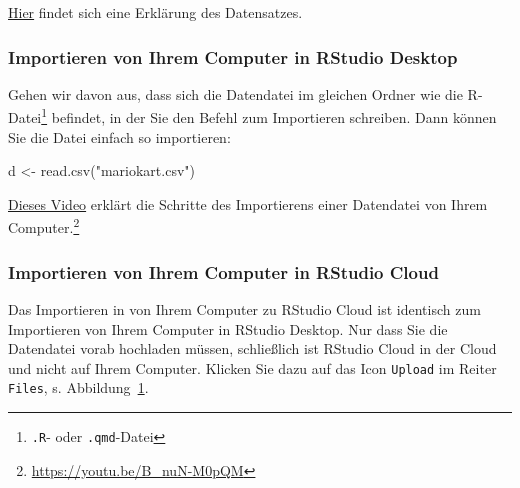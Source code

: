 \documentclass[
  a4paper,
  DIV=11]{scrreprt}
\newenvironment{Shaded}{\begin{snugshade}}{\end{snugshade}}
\newcommand{\FunctionTok}[1]{\textcolor[rgb]{0.28,0.35,0.67}{#1}}
\newcommand{\NormalTok}[1]{\textcolor[rgb]{0.00,0.23,0.31}{#1}}
\newcommand{\OtherTok}[1]{\textcolor[rgb]{0.00,0.23,0.31}{#1}}
\newcommand{\StringTok}[1]{\textcolor[rgb]{0.13,0.47,0.30}{#1}}
\theoremstyle{definition}
\theoremstyle{definition}
\theoremstyle{definition}
\theoremstyle{remark}
\begin{document}
\href{https://vincentarelbundock.github.io/Rdatasets/doc/openintro/mariokart.html}{Hier}
findet sich eine Erklärung des Datensatzes.

\subsubsection{Importieren von Ihrem Computer in RStudio
Desktop}\label{importieren-von-ihrem-computer-in-rstudio-desktop}

Gehen wir davon aus, dass sich die Datendatei im gleichen Ordner wie die
R-Datei\footnote{\texttt{.R}- oder \texttt{.qmd}-Datei} befindet, in der
Sie den Befehl zum Importieren schreiben. Dann können Sie die Datei
einfach so importieren:

\begin{Shaded}
\begin{Highlighting}[]
\NormalTok{d }\OtherTok{\textless{}{-}} \FunctionTok{read.csv}\NormalTok{(}\StringTok{"mariokart.csv"}\NormalTok{)}
\end{Highlighting}
\end{Shaded}

\href{https://youtu.be/B_nuN-M0pQM}{Dieses Video} erklärt die Schritte
des Importierens einer Datendatei von Ihrem Computer.\footnote{\url{https://youtu.be/B_nuN-M0pQM}}

\subsubsection{Importieren von Ihrem Computer in RStudio
Cloud}\label{importieren-von-ihrem-computer-in-rstudio-cloud}

Das Importieren in von Ihrem Computer zu RStudio Cloud ist identisch zum
Importieren von Ihrem Computer in RStudio Desktop. Nur dass Sie die
Datendatei vorab hochladen müssen, schließlich ist RStudio Cloud in der
Cloud und nicht auf Ihrem Computer. Klicken Sie dazu auf das Icon
\texttt{Upload} im Reiter \texttt{Files}, s.
Abbildung~\ref{fig-upload-to-posit-cloud}.

\begin{figure}


\caption{\label{fig-upload-to-posit-cloud}}

\end{figure}%
\end{document}
